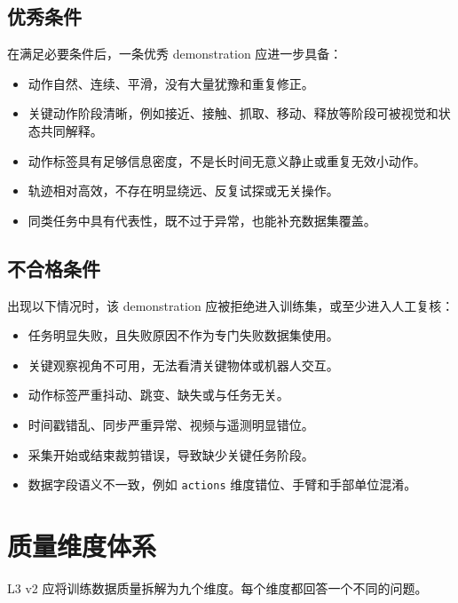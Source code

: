 \documentclass[UTF8,zihao=-4,oneside,openany]{ctexrep}
\begin{document}
\subsection{优秀条件}

在满足必要条件后，一条优秀 demonstration 应进一步具备：

\begin{itemize}
  \item 动作自然、连续、平滑，没有大量犹豫和重复修正。
  \item 关键动作阶段清晰，例如接近、接触、抓取、移动、释放等阶段可被视觉和状态共同解释。
  \item 动作标签具有足够信息密度，不是长时间无意义静止或重复无效小动作。
  \item 轨迹相对高效，不存在明显绕远、反复试探或无关操作。
  \item 同类任务中具有代表性，既不过于异常，也能补充数据集覆盖。
\end{itemize}

\subsection{不合格条件}

出现以下情况时，该 demonstration 应被拒绝进入训练集，或至少进入人工复核：

\begin{itemize}
  \item 任务明显失败，且失败原因不作为专门失败数据集使用。
  \item 关键观察视角不可用，无法看清关键物体或机器人交互。
  \item 动作标签严重抖动、跳变、缺失或与任务无关。
  \item 时间戳错乱、同步严重异常、视频与遥测明显错位。
  \item 采集开始或结束裁剪错误，导致缺少关键任务阶段。
  \item 数据字段语义不一致，例如 \texttt{actions} 维度错位、手臂和手部单位混淆。
\end{itemize}

\section{质量维度体系}

L3 v2 应将训练数据质量拆解为九个维度。每个维度都回答一个不同的问题。
\end{document}

